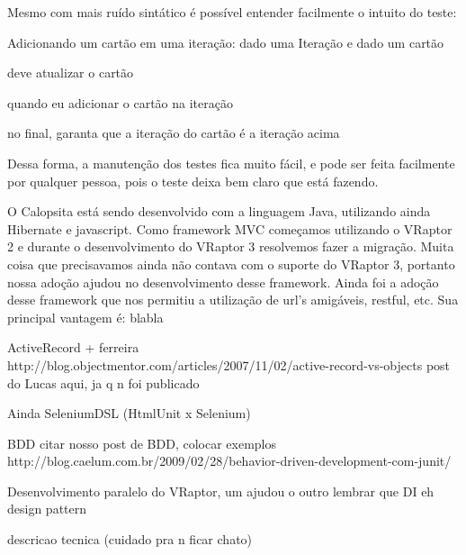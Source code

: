 Mesmo com mais ruído sintático é possível entender facilmente o intuito do teste:

Adicionando um cartão em uma iteração:
  dado uma Iteração e
  dado um cartão
  
  deve atualizar o cartão
  
  quando eu adicionar o cartão na iteração
  
  no final, garanta que a iteração do cartão é a iteração acima
  

Dessa forma, a manutenção dos testes fica muito fácil, e pode ser feita facilmente por qualquer pessoa, pois o teste deixa bem claro que está fazendo.


O Calopsita está sendo desenvolvido com a linguagem Java, utilizando ainda Hibernate e javascript. Como framework MVC começamos utilizando o VRaptor 2 e durante o desenvolvimento do VRaptor 3 resolvemos fazer a migração. Muita coisa que precisavamos ainda não contava com o suporte do VRaptor 3, portanto nossa adoção ajudou no desenvolvimento desse framework. Ainda foi a adoção desse framework que nos permitiu a utilização de url's amigáveis, restful, etc. Sua principal vantagem é: blabla




ActiveRecord + ferreira
http://blog.objectmentor.com/articles/2007/11/02/active-record-vs-objects
post do Lucas aqui, ja q n foi publicado

Ainda SeleniumDSL (HtmlUnit x Selenium)

BDD
citar nosso post de BDD, colocar exemplos
http://blog.caelum.com.br/2009/02/28/behavior-driven-development-com-junit/

Desenvolvimento paralelo do VRaptor, um ajudou o outro
lembrar que DI eh design pattern

descricao tecnica (cuidado pra n ficar chato)


